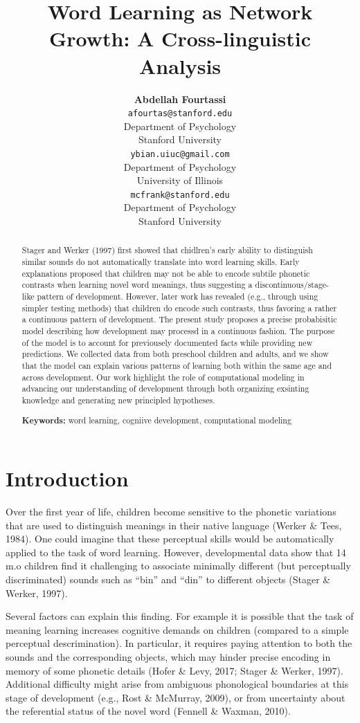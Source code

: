 \documentclass[10pt, letterpaper]{article}
\title{Word Learning as Network Growth: A Cross-linguistic Analysis}
\author{{\large \bf Abdellah Fourtassi} \\ \texttt{afourtas@stanford.edu} \\ Department of Psychology \\ Stanford University \And {\large \bf Yuan Bian} \\ \texttt{ybian.uiuc@gmail.com} \\ Department of Psychology \\ University of Illinois \And {\large \bf Michael C. Frank} \\ \texttt{mcfrank@stanford.edu} \\ Department of Psychology \\ Stanford University}
\begin{document}
\maketitle

\begin{abstract}
Stager and Werker (1997) first showed that chidlren's early ability to
distinguish similar sounds do not automatically translate into word
learning skills. Early explanations proposed that children may not be
able to encode subtile phonetic contrasts when learning novel word
meanings, thus suggesting a discontinuous/stage-like pattern of
development. However, later work has revealed (e.g., through using
simpler testing methods) that children do encode such contrasts, thus
favoring a rather a continuous pattern of development. The present study
proposes a precise probabisitic model describing how development may
processd in a continuous fashion. The purpose of the model is to account
for previousely documented facts while providing new predictions. We
collected data from both preschool children and adults, and we show that
the model can explain various patterns of learning both within the same
age and across development. Our work highlight the role of computational
modeling in advancing our understanding of development through both
organizing exsinting knowledge and generating new principled hypotheses.

\textbf{Keywords:}
word learning, cogniive development, computational modeling
\end{abstract}

\section{Introduction}\label{introduction}

Over the first year of life, children become sensitive to the phonetic
variations that are used to distinguish meanings in their native
language (Werker \& Tees, 1984). One could imagine that these perceptual
skills would be automatically applied to the task of word learning.
However, developmental data show that 14 m.o children find it
challenging to associate minimally different (but perceptually
discriminated) sounds such as ``bin'' and ``din'' to different objects
(Stager \& Werker, 1997).

Several factors can explain this finding. For example it is possible
that the task of meaning learning increases cognitive demands on
children (compared to a simple perceptual descrimination). In
particular, it requires paying attention to both the sounds and the
corresponding objects, which may hinder precise encoding in memory of
some phonetic details (Hofer \& Levy, 2017; Stager \& Werker, 1997).
Additional difficulty might arise from ambiguous phonological boundaries
at this stage of development (e.g., Rost \& McMurray, 2009), or from
uncertainty about the referential status of the novel word (Fennell \&
Waxman, 2010).
\end{document}
